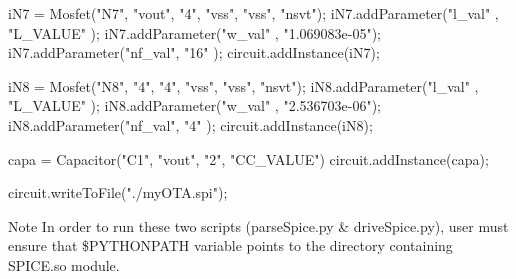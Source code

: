 \begin{DoxyCodeInclude}
iN7 = Mosfet(\textcolor{stringliteral}{"N7"}, \textcolor{stringliteral}{"vout"}, \textcolor{stringliteral}{"4"}, \textcolor{stringliteral}{"vss"}, \textcolor{stringliteral}{"vss"}, \textcolor{stringliteral}{"nsvt"});
iN7.addParameter(\textcolor{stringliteral}{"l\_val"} , \textcolor{stringliteral}{"L\_VALUE"}     );
iN7.addParameter(\textcolor{stringliteral}{"w\_val"} , \textcolor{stringliteral}{"1.069083e-05"});
iN7.addParameter(\textcolor{stringliteral}{"nf\_val"}, \textcolor{stringliteral}{"16"}          );
circuit.addInstance(iN7);

iN8 = Mosfet(\textcolor{stringliteral}{"N8"}, \textcolor{stringliteral}{"4"}, \textcolor{stringliteral}{"4"}, \textcolor{stringliteral}{"vss"}, \textcolor{stringliteral}{"vss"}, \textcolor{stringliteral}{"nsvt"});
iN8.addParameter(\textcolor{stringliteral}{"l\_val"} , \textcolor{stringliteral}{"L\_VALUE"}     );
iN8.addParameter(\textcolor{stringliteral}{"w\_val"} , \textcolor{stringliteral}{"2.536703e-06"});
iN8.addParameter(\textcolor{stringliteral}{"nf\_val"}, \textcolor{stringliteral}{"4"}           );
circuit.addInstance(iN8);

capa = Capacitor(\textcolor{stringliteral}{"C1"}, \textcolor{stringliteral}{"vout"}, \textcolor{stringliteral}{"2"}, \textcolor{stringliteral}{"CC\_VALUE"})
circuit.addInstance(capa);

circuit.writeToFile(\textcolor{stringliteral}{"./myOTA.spi"});
\end{DoxyCodeInclude}


\begin{DoxyNote}{Note}
In order to run these two scripts ({\ttfamily parse\+Spice.\+py} \& drive\+Spice.\+py), user must ensure that \$\+P\+Y\+T\+H\+O\+N\+P\+A\+TH variable points to the directory containing S\+P\+I\+C\+E.\+so module. 
\end{DoxyNote}
